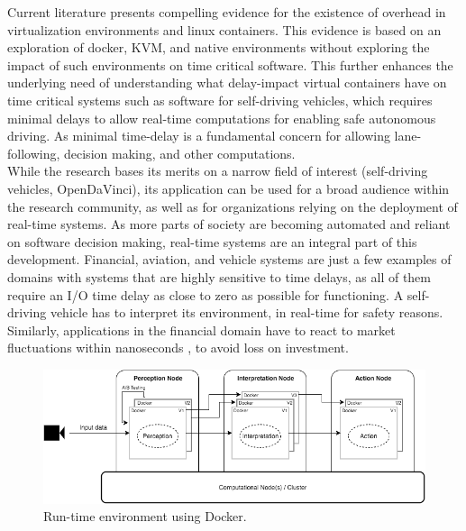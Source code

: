 Current literature \cite{vmvscontainers} presents compelling evidence for the existence of overhead in virtualization environments and linux containers. This evidence is based on an exploration of docker, KVM, and native environments without exploring the impact of such environments on time critical software. This further enhances the underlying need of understanding what delay-impact virtual containers have on time critical systems such as software for self-driving vehicles, which requires minimal delays to allow real-time computations for enabling safe autonomous driving. As minimal time-delay is a fundamental concern for allowing lane-following, decision making, and other computations.\\

While the research bases its merits on a narrow field of interest (self-driving vehicles, OpenDaVinci), its application can be used for a broad audience within the research community, as well as for organizations relying on the deployment of real-time systems. As more parts of society are becoming automated and reliant on software decision making, real-time systems are an integral part of this development. Financial, aviation, and vehicle systems are just a few examples of domains with systems that are highly sensitive to time delays, as all of them require an I/O time delay as close to zero as possible for functioning. A self-driving vehicle has to interpret its environment, in real-time for safety reasons. Similarly, applications in the financial domain have to react to market fluctuations within nanoseconds \cite{wallstreetjournal}, to avoid loss on investment. \\


\begin{figure}[ht]
\centering
     \includegraphics[width=1.0\textwidth]{./figure/containers.png}
      \caption{Run-time environment using Docker.}
       \label{containers}
\end{figure}


